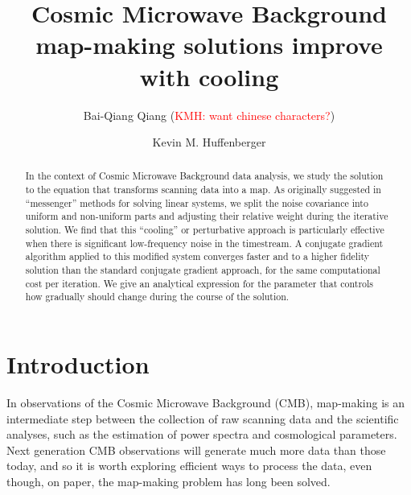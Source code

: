 \documentclass[twocolumn,linenumbers]{aastex631}
\newcommand{\kmh}[1]{\textcolor{red}{KMH: #1}}
\begin{document}
\title{Cosmic Microwave Background map-making solutions improve with cooling}


  \author{Bai-Qiang Qiang (\kmh{want chinese characters?})} %

\author[0000-0001-7109-0099]{Kevin M. Huffenberger}

 
\begin{abstract}

In the context of Cosmic Microwave Background data analysis, we study the solution to the equation that transforms scanning data into a map.
As originally suggested in ``messenger'' methods for solving linear systems, we split the  noise covariance into uniform and non-uniform parts and adjusting their relative weight during the iterative solution.
We find that this ``cooling'' or perturbative approach is particularly effective when there is significant low-frequency noise in the timestream.
A conjugate gradient algorithm applied to this modified system converges faster and to a higher fidelity solution than the standard conjugate gradient approach, for the same computational cost per iteration.
We give an analytical expression for the parameter that controls how gradually should change during the course of the solution. 

\end{abstract}


\section{Introduction} \label{sec:intro}


In observations of the Cosmic Microwave Background (CMB), map-making is an intermediate step between the collection of raw scanning data and the scientific analyses, such as the estimation of power spectra and cosmological parameters.
Next generation CMB observations will generate much more data than those today, and so
it is worth exploring efficient ways to process the data, even though, on paper, the map-making problem has long been solved.
\end{document}
